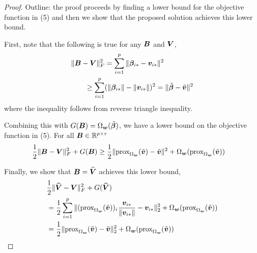 \begin{proof}
Outline: the proof proceeds by finding a lower bound for the objective function in (5) and then we show that the proposed solution achieves this lower bound.

First, note that the following is true for any $\boldsymbol{B}$ and $\boldsymbol{V}$,
\begin{align*}\label{eqn1}
\|\bB - \bV\|_F^2 &= \sum_{i=1}^p\|\bbeta_{i \a} - \bv_{i \a}\|^2 \\
 \geq \sum_{i=1}^p&(\|\bbeta_{i \a}\| - \|\bv_{i \a}\|)^2 = \|\tilde{\bbeta} - \tilde{\bv}\|^2
\end{align*}
where the inequality follows from reverse triangle inequality. 

Combining this with $G(\boldsymbol{B}) = \Omega_{\boldsymbol{w}}(\tilde{\boldsymbol{\beta}})$, we have a lower bound on the objective function in (5). For all $\boldsymbol{B} \in {\mathbb R}^{p \times r}$
\begin{align*}
\frac{1}{2}\|\boldsymbol{B} - \boldsymbol{V}\|_F^2 + G(\boldsymbol{B})
&\geq \frac{1}{2} \|\textnormal{prox}_{\Omega_{\boldsymbol{w}}}(\tilde{\boldsymbol{v}}) -  \tilde{\boldsymbol{v}}\|^2 + \Omega_{\boldsymbol{w}}(\textnormal{prox}_{\Omega_{\boldsymbol{w}}}(\tilde{\boldsymbol{v}})) 
\end{align*}

Finally, we show that $\boldsymbol{B} = \widehat {\boldsymbol{V}}$ achieves this lower bound,
\begin{align*}
&\frac{1}{2}\|\widehat {\boldsymbol{V}} - \boldsymbol{V}\|_F^2 + G(\widehat {\boldsymbol{V}}) \\
& = \frac{1}{2} \sum_{i = 1}^p \|(\textnormal{prox}_{\Omega_{\boldsymbol{w}}}(\tilde{\boldsymbol{v}}))_i \frac{\boldsymbol{v}_{i {\ast}}}{\|\boldsymbol{v}_{i {\ast}}\|} - \boldsymbol{v}_{i {\ast}}\|^2_2 + \Omega_{\boldsymbol{w}}(\textnormal{prox}_{\Omega_{\boldsymbol{w}}}(\tilde{\boldsymbol{v}})) \\
 & = \frac{1}{2} \|\textnormal{prox}_{\Omega_{\boldsymbol{w}}}(\tilde{\boldsymbol{v}}) -  \tilde{\boldsymbol{v}}\|^2_2 + \Omega_{\boldsymbol{w}}(\textnormal{prox}_{\Omega_{\boldsymbol{w}}}(\tilde{\boldsymbol{v}})) 
\end{align*}
\end{proof}
